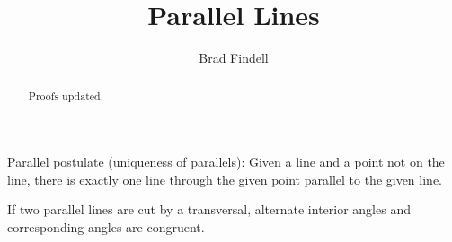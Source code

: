 \documentclass[nooutcomes]{ximera}
\title{Parallel Lines}
\author{Brad Findell}
\begin{document}
\begin{abstract}
Proofs updated. 
\end{abstract}
\maketitle

\begin{axiom}
Parallel postulate (uniqueness of parallels):  Given a line and a point not on the line, there is exactly one line through the given point parallel to the given line.  
\end{axiom}


\begin{theorem}
If two parallel lines are cut by a transversal, alternate interior angles and corresponding angles are congruent.
\end{theorem}
\end{document}
